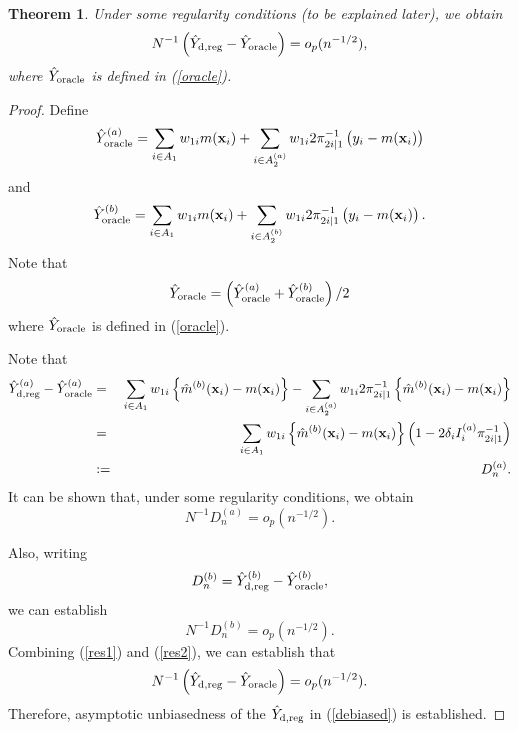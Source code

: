 \documentclass[12pt]{article}
\newtheorem{theorem}{Theorem}
\newcommand{\bx}{\mathbf{x}}
\begin{document}
\begin{theorem}
Under some regularity conditions (to be explained later), we obtain 
\begin{equation}
N^{-1} \left( \hat{Y}_{\rm d, reg} - \hat{Y}_{\rm oracle} \right) =o_p( n^{-1/2} ),
\label{result}
\end{equation}
where $\hat{Y}_{\rm oracle}$ is defined in (\ref{oracle}). 
\end{theorem}
\begin{proof}
Define 
$$ \hat{Y}_{\rm oracle}^{(a)} = \sum_{i \in A_1} w_{1i} m(\bx_i) + \sum_{i \in A_2^{(a)} }w_{1i} 2 \pi_{2i \mid 1}^{-1} \left( y_i - m(\bx_i) \right) $$
and
$$ \hat{Y}_{\rm oracle}^{(b)} = \sum_{i \in A_1} w_{1i} m(\bx_i) + \sum_{i \in A_2^{(b)} }w_{1i} 2 \pi_{2i \mid 1}^{-1} \left( y_i - m(\bx_i) \right) .$$
Note that 
$$ \hat{Y}_{\rm oracle} = \left( \hat{Y}_{\rm oracle}^{(a)} + \hat{Y}_{\rm oracle}^{(b)} \right)/ 2$$
where $\hat{Y}_{\rm oracle}$ is defined in (\ref{oracle}). 

Note that  
\begin{eqnarray*}
 \hat{Y}_{\rm d, reg}^{(a)} - \hat{Y}_{\rm  oracle}^{(a)} &=&\sum_{i \in A_1} w_{1i} \left\{ \hat{m}^{(b)} (\bx_i) - m(\bx_i) \right\} -\sum_{i \in A_2^{(a)}} w_{1i} 2\pi_{2i|1}^{-1} \left\{ \hat{m}^{(b)}  (\bx_i) - m(\bx_i) \right\} \\
 &=& \sum_{i \in A_1} w_{1i} \left\{ \hat{m}^{(b)}  (\bx_i) - m(\bx_i) \right\} \left( 1- 2 \delta_i I_i^{(a)} \pi_{2i|1}^{-1} \right) \\
 &:=& D_n^{(a)} .\end{eqnarray*} 
It can be shown that, under some regularity conditions, we obtain 
\begin{equation}
 N^{-1} D_n^{(a)} = o_p(n^{-1/2} ).
 \label{res1}
 \end{equation}

Also, writing 
$$ D_n^{(b)} = \hat{Y}_{\rm d, reg}^{(b)} - \hat{Y}_{\rm  oracle}^{(b)},  $$
we can establish 
\begin{equation}
 N^{-1} D_n^{(b)} = o_p(n^{-1/2} ).
 \label{res2}
 \end{equation}
Combining (\ref{res1}) and (\ref{res2}), we can establish that 
\begin{equation}
N^{-1} \left( \hat{Y}_{\rm d, reg} - \hat{Y}_{\rm oracle} \right) =o_p( n^{-1/2} ).
\label{result}
\end{equation}
Therefore, asymptotic unbiasedness of the $\hat{Y}_{\rm d, reg}$ in (\ref{debiased}) is established. 
 \end{proof}
\end{document}
